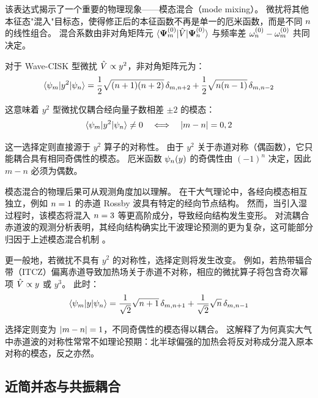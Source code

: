 该表达式揭示了一个重要的物理现象——模态混合（mode mixing）。
微扰将其他本征态"混入"目标态，使得修正后的本征函数不再是单一的厄米函数，而是不同 $n$ 的线性组合。
混合系数由非对角矩阵元 $\langle \bm{\Psi}_m^{(0)} | \hat{V} | \bm{\Psi}_n^{(0)} \rangle$ 与频率差 $\omega_n^{(0)} - \omega_m^{(0)}$ 共同决定。

对于 Wave-CISK 型微扰 $\hat{V} \propto y^2$，非对角矩阵元为：
\begin{equation}
    \langle \psi_{m} | y^2 | \psi_{n} \rangle = \frac{1}{2}\sqrt{(n+1)(n+2)}\,\delta_{m,n+2} + \frac{1}{2}\sqrt{n(n-1)}\,\delta_{m,n-2}
    \label{eq:y2_offdiagonal}
\end{equation}

这意味着 $y^2$ 型微扰仅耦合经向量子数相差 $\pm 2$ 的模态：
\begin{equation}
    \langle \psi_{m} | y^2 | \psi_{n} \rangle \neq 0 \quad \Longleftrightarrow \quad \lvert m - n \rvert = 0, 2
    \label{eq:selection_rule}
\end{equation}

这一选择定则直接源于 $y^2$ 算子的对称性。
由于 $y^2$ 关于赤道对称（偶函数），它只能耦合具有相同奇偶性的模态。
厄米函数 $\psi_{n}(y)$ 的奇偶性由 $(-1)^n$ 决定，因此 $m - n$ 必须为偶数。

模态混合的物理后果可从观测角度加以理解。
在干大气理论中，各经向模态相互独立，例如 $n = 1$ 的赤道 Rossby 波具有特定的经向节点结构。
然而，当引入湿过程时，该模态将混入 $n = 3$ 等更高阶成分，导致经向结构发生变形。
对流耦合赤道波的观测分析表明，其经向结构确实比干波理论预测的更为复杂，这可能部分归因于上述模态混合机制 \citep{kiladisConvectivelyCoupledEquatorial2009}。

更一般地，若微扰不具有 $y^2$ 的对称性，选择定则将发生改变。
例如，若热带辐合带（ITCZ）偏离赤道导致加热场关于赤道不对称，相应的微扰算子将包含奇次幂项 $\hat{V} \propto y$ 或 $y^3$。
此时：
\begin{equation}
    \langle \psi_{m} | y | \psi_{n} \rangle = \frac{1}{\sqrt{2}}\sqrt{n+1}\,\delta_{m,n+1} + \frac{1}{\sqrt{2}}\sqrt{n}\,\delta_{m,n-1}
    \label{eq:y_matrix_element}
\end{equation}

选择定则变为 $\lvert m - n \rvert = 1$，不同奇偶性的模态得以耦合。
这解释了为何真实大气中赤道波的对称性常常不如理论预期：北半球偏强的加热会将反对称成分混入原本对称的模态，反之亦然。

\subsection{近简并态与共振耦合}
\label{subsec:degeneracy}

